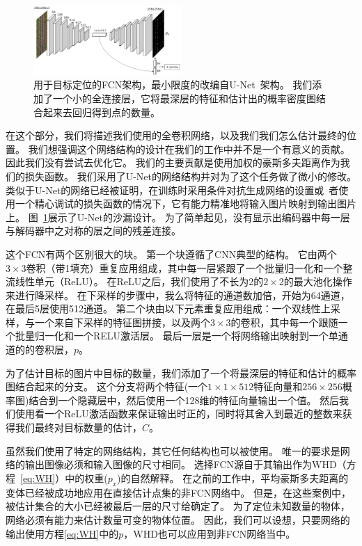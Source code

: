 \documentclass[10pt,twocolumn,letterpaper,UTF8]{article}
\begin{document}
\begin{figure}[t]
\begin{center}
   \includegraphics[width=0.5\textwidth]{fig/unetlike.png}
\end{center}
   \caption{
            用于目标定位的FCN架构，最小限度的改编自U-Net~\cite{unet}架构。
            我们添加了一个小的全连接层，它将最深层的特征和估计出的概率密度图结合起来去回归得到点的数量。
            }
\label{fig:unet_like}
\end{figure}
在这个部分，我们将描述我们使用的全卷积网络，以及我们我们怎么估计最终的位置。
我们想强调这个网络结构的设计在我们的工作中并不是一个有意义的贡献。
因此我们没有尝试去优化它。
我们的主要贡献是使用加权的豪斯多夫距离作为我们的损失函数。
我们采用了U-Net的网络结构\cite{unet}并对为了这个任务做了微小的修改。
类似于U-Net的网络已经被证明，在训练时采用条件对抗生成网络的设置或~\cite{pix2pix}者使用一个精心调试的损失函数的情况下，它有能力精准地将输入图片映射到输出图片上。
图~\ref{fig:unet_like}展示了U-Net的沙漏设计。
为了简单起见，没有显示出编码器中每一层与解码器中之对称的层之间的残差连接。

这个FCN有两个区别很大的块。
第一个块遵循了CNN典型的结构。
它由两个$3\times3$卷积（带1填充）重复应用组成，其中每一层紧跟了一个批量归一化和一个整流线性单元（ReLU）。
在ReLU之后，我们使用了不长为2的$2\times 2$的最大池化操作来进行降采样。
在下采样的步骤中，我么将特征的通道数加倍，开始为64通道，在最后5层使用512通道。
第二个块由以下元素重复应用组成：一个双线性上采样，与一个来自下采样的特征图拼接，以及两个$3 \times 3$的卷积，其中每一个跟随一个批量归一化和一个RELU激活层。
最后一层是一个将网络输出映射到一个单通道的的卷积层，$p$。

为了估计目标的图片中目标的数量，我们添加了一个将最深层的特征和估计的概率图结合起来的分支。
这个分支将两个特征(一个$1\times 1 \times 512$特征向量和$256 \times 256$概率图)结合到一个隐藏层中，然后使用一个128维的特征向量输出一个值。
然后我们使用看一个ReLU激活函数来保证输出时正的，同时将其舍入到最近的整数来获得我们最终对目标数量的估计，$\hat{C}$。

虽然我们使用了特定的网络结构，其它任何结构也可以被使用。
唯一的要求是网络的输出图像必须和输入图像的尺寸相同。
选择FCN源自于其输出作为WHD（方程~\eqref{eq:WH}）中的权重($p_x$)的自然解释。
在之前的工作中\cite{elkhiyari2017,fan2017}，平均豪斯多夫距离的变体已经被成功地应用在直接估计点集的非FCN网络中。
但是，在这些案例中，被估计集合的大小已经被最后一层的尺寸给确定了。
为了定位未知数量的物体，网络必须有能力来估计数量可变的物体位置。
因此，我们可以设想，只要网络的输出使用方程\eqref{eq:WH}中的$p$，WHD也可以应用到非FCN网络当中。
\end{document}
